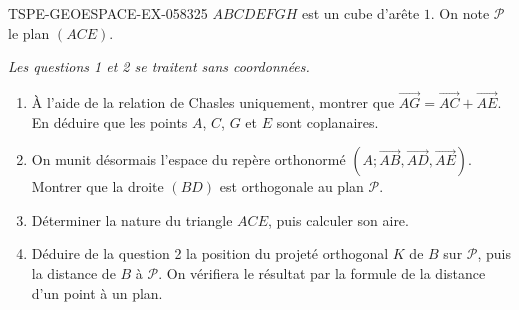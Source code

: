 \begin{exercice}{TSPE-GEOESPACE-EX-058}{3}{25}
$ABCDEFGH$ est un cube d'arête $1$. On note $\mathcal{P}$ le plan $(ACE)$.

\emph{Les questions 1 et 2 se traitent sans coordonnées.}
\begin{enumerate}
  \item À l'aide de la relation de Chasles uniquement, montrer que
        $\vec{AG}=\vec{AC}+\vec{AE}$. En déduire que les points $A$, $C$, $G$
        et $E$ sont coplanaires.
  \item On munit désormais l'espace du repère orthonormé
        $(A;\vec{AB},\vec{AD},\vec{AE})$. Montrer que la droite $(BD)$ est
        orthogonale au plan $\mathcal{P}$.
  \item Déterminer la nature du triangle $ACE$, puis calculer son aire.
  \item Déduire de la question 2 la position du projeté orthogonal $K$ de $B$
        sur $\mathcal{P}$, puis la distance de $B$ à $\mathcal{P}$. On
        vérifiera le résultat par la formule de la distance d'un point à un
        plan.
\end{enumerate}
\end{exercice}
